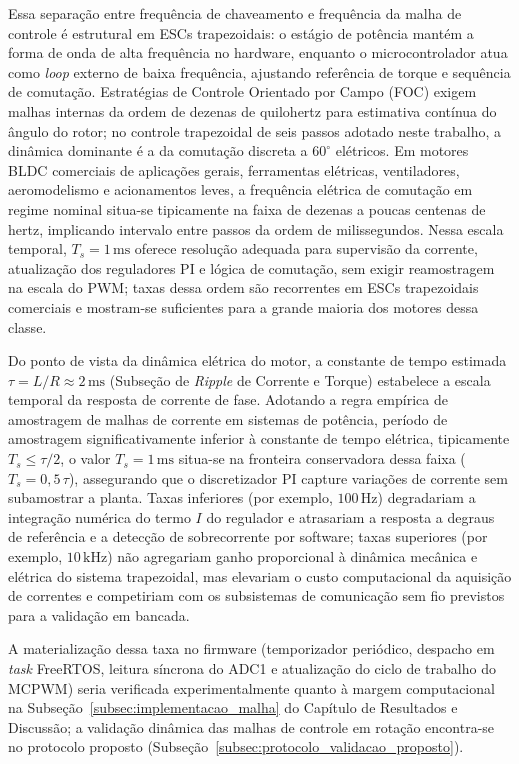Essa separação entre frequência de chaveamento e frequência da malha de controle é estrutural em ESCs trapezoidais: o estágio de potência mantém a forma de onda de alta frequência no hardware, enquanto o microcontrolador atua como \textit{loop} externo de baixa frequência, ajustando referência de torque e sequência de comutação. Estratégias de Controle Orientado por Campo (FOC) exigem malhas internas da ordem de dezenas de quilohertz para estimativa contínua do ângulo do rotor; no controle trapezoidal de seis passos adotado neste trabalho, a dinâmica dominante é a da comutação discreta a $60^{\circ}$ elétricos. Em motores BLDC comerciais de aplicações gerais, ferramentas elétricas, ventiladores, aeromodelismo e acionamentos leves, a frequência elétrica de comutação em regime nominal situa-se tipicamente na faixa de dezenas a poucas centenas de hertz, implicando intervalo entre passos da ordem de milissegundos. Nessa escala temporal, $T_s = 1\,\text{ms}$ oferece resolução adequada para supervisão da corrente, atualização dos reguladores PI e lógica de comutação, sem exigir reamostragem na escala do PWM; taxas dessa ordem são recorrentes em ESCs trapezoidais comerciais e mostram-se suficientes para a grande maioria dos motores dessa classe.

Do ponto de vista da dinâmica elétrica do motor, a constante de tempo estimada $\tau = L/R \approx 2\,\text{ms}$ (Subseção de \textit{Ripple} de Corrente e Torque) estabelece a escala temporal da resposta de corrente de fase. Adotando a regra empírica de amostragem de malhas de corrente em sistemas de potência, período de amostragem significativamente inferior à constante de tempo elétrica, tipicamente $T_s \leq \tau/2$, o valor $T_s = 1\,\text{ms}$ situa-se na fronteira conservadora dessa faixa ($T_s = 0{,}5\,\tau$), assegurando que o discretizador PI capture variações de corrente sem subamostrar a planta. Taxas inferiores (por exemplo, $100\,\text{Hz}$) degradariam a integração numérica do termo $I$ do regulador e atrasariam a resposta a degraus de referência e a detecção de sobrecorrente por software; taxas superiores (por exemplo, $10\,\text{kHz}$) não agregariam ganho proporcional à dinâmica mecânica e elétrica do sistema trapezoidal, mas elevariam o custo computacional da aquisição de correntes e competiriam com os subsistemas de comunicação sem fio previstos para a validação em bancada.

A materialização dessa taxa no firmware (temporizador periódico, despacho em \textit{task} FreeRTOS, leitura síncrona do ADC1 e atualização do ciclo de trabalho do MCPWM) seria verificada experimentalmente quanto à margem computacional na Subseção~\ref{subsec:implementacao_malha} do Capítulo de Resultados e Discussão; a validação dinâmica das malhas de controle em rotação encontra-se no protocolo proposto (Subseção~\ref{subsec:protocolo_validacao_proposto}).

